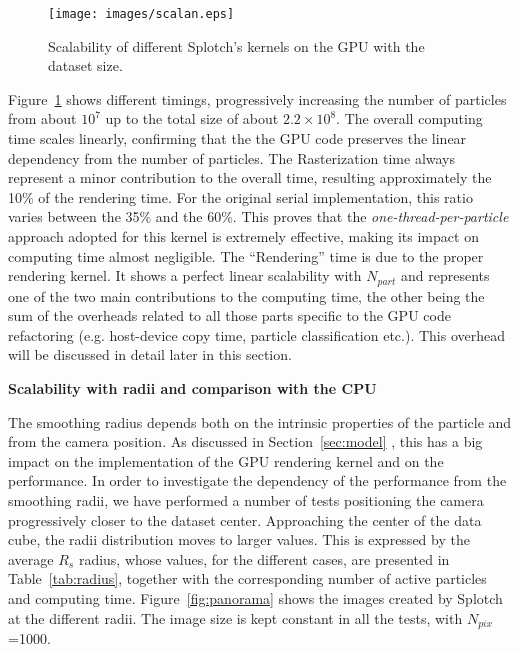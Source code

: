 \documentclass[1p]{elsarticle}
\begin{document}
\begin{figure}
\centering
\texttt{[image: images/scalan.eps]}
\caption{Scalability of different Splotch's kernels on the GPU with the dataset size.}
\label{fig:scalability}
\end{figure}

Figure~\ref{fig:scalability} shows different timings, progressively increasing the number of particles
from about $10^7$ up to the total size of about $2.2\times 10^8$. 
The overall computing time scales linearly, 
confirming that the the GPU code preserves the linear dependency from the 
number of particles. 
The Rasterization time always represent 
a minor contribution to the overall time, resulting approximately the 10\% of the rendering 
time. For the original serial implementation, this ratio varies between the 35\% and the 60\%.
This proves that the {\it one-thread-per-particle} approach adopted for this kernel
is extremely effective, making its impact on computing time almost negligible.
The ``Rendering'' time 
is due to the proper rendering kernel. It shows a perfect linear scalability
with $N_{part}$ and represents one of the two main contributions
to the computing time, the other being the sum of the overheads related to all those 
parts specific to the GPU code refactoring 
(e.g. host-device copy time, particle classification etc.). 
This overhead  will be discussed in detail later in this section.

\medskip
\noindent
{\bf Scalability with radii and comparison with the CPU}

\noindent
The smoothing radius depends both on the intrinsic properties of the particle
and from the camera position. 
As discussed in Section~\ref{sec:model} , this has a big impact 
on the implementation of the GPU rendering kernel and
on the performance. In order to investigate the dependency of the performance from
the smoothing radii, we have performed a number of tests 
positioning the camera progressively closer to the dataset center. 
Approaching the center of the 
data cube, the radii distribution moves to larger values. This is expressed 
by the average $R_s$ radius, whose values, for the different cases, are presented in 
Table~\ref{tab:radius}, together with the corresponding number of active particles and computing time. 
Figure~\ref{fig:panorama} shows the images created by Splotch at the different radii.
The image size is kept constant in all the tests, with $N_{pix}$=1000.
\end{document}
